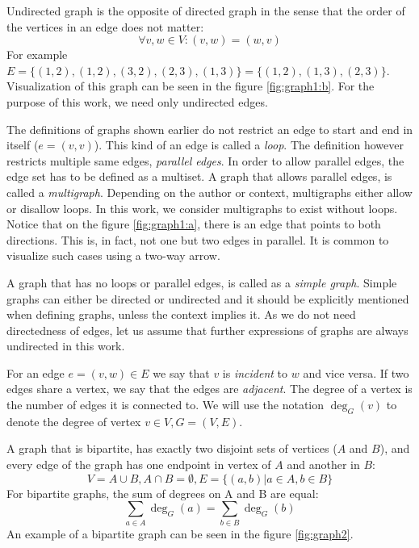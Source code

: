 Undirected graph is the opposite of directed graph in the sense that the order of the vertices in an edge does not matter:
\begin{equation}
\forall v, w \in V: (v, w) = (w, v)
\end{equation}
For example $E=\{(1, 2), (1, 2), (3, 2), (2, 3), (1, 3)\}=\{(1,2),(1,3),(2,3)\}$.
Visualization of this graph can be seen in the figure \ref{fig:graph1:b}.
For the purpose of this work, we need only undirected edges.

The definitions of graphs shown earlier do not restrict an edge to start and end in itself ($e=(v, v)$).
This kind of an edge is called a \emph{loop}.
The definition however restricts multiple same edges, \emph{parallel edges}.
In order to allow parallel edges, the edge set has to be defined as a multiset.
A graph that allows parallel edges, is called a \emph{multigraph}.
Depending on the author or context, multigraphs either allow or disallow loops.
In this work, we consider multigraphs to exist without loops.
Notice that on the figure \ref{fig:graph1:a}, there is an edge that points to both directions.
This is, in fact, not one but two edges in parallel.
It is common to visualize such cases using a two-way arrow.

A graph that has no loops or parallel edges, is called as a \emph{simple graph}.
Simple graphs can either be directed or undirected and it should be explicitly mentioned when defining graphs, unless the context implies it.
As we do not need directedness of edges, let us assume that further expressions of graphs are always undirected in this work.

For an edge $e=(v, w) \in E$ we say that $v$ is \emph{incident} to $w$ and vice versa.
If two edges share a vertex, we say that the edges are \emph{adjacent}.
The degree of a vertex is the number of edges it is connected to.
We will use the notation $\deg_G(v)$ to denote the degree of vertex $v \in V, G=(V,E)$.

A graph that is bipartite, has exactly two disjoint sets of vertices ($A$ and $B$), and every edge of the graph has one endpoint in vertex of $A$ and another in $B$:
\begin{equation}
V = A \cup B, A \cap B = \emptyset, E=\{(a, b) | a \in A, b \in B\}
\end{equation}
For bipartite graphs, the sum of degrees on A and B are equal:
\begin{equation}
\sum_{a\in A} \deg_G(a) = \sum_{b\in B} \deg_G(b)
\end{equation}
An example of a bipartite graph can be seen in the figure \ref{fig:graph2}.

